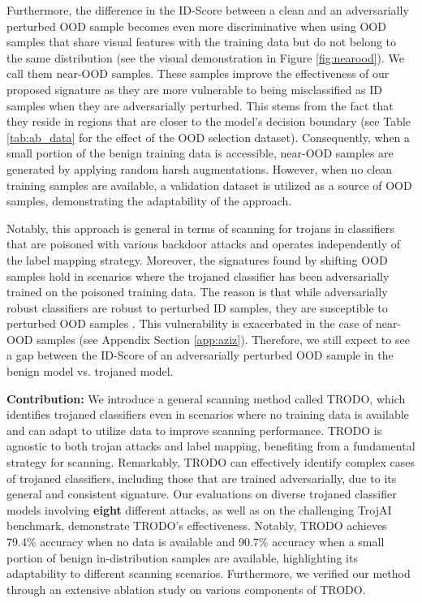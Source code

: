 Furthermore, the difference in the ID-Score between a clean and an adversarially perturbed OOD sample becomes even more discriminative when using OOD samples that share visual features with the training data but do not belong to the same distribution (see the visual demonstration in Figure \ref{fig:nearood}). We call them near-OOD samples. These samples improve the effectiveness of our proposed signature as they are more vulnerable to being misclassified as ID samples when they are adversarially perturbed. This stems from the fact that they reside in regions that are closer to the model's decision boundary (see Table \ref{tab:ab_data} for the effect of the OOD selection dataset). Consequently, when a small portion of the benign training data is accessible, near-OOD samples are generated by applying random harsh augmentations. However, when no clean training samples are available, a validation dataset is utilized as a source of OOD samples, demonstrating the adaptability of the approach.

Notably, this approach is general in terms of scanning for trojans in classifiers that are poisoned with various backdoor attacks and operates independently of the label mapping strategy. Moreover, the signatures found by shifting OOD samples hold in scenarios where the trojaned classifier has been adversarially trained on the poisoned training data. The reason is that while adversarially robust classifiers are robust to perturbed ID samples, they are susceptible to perturbed OOD samples \cite{azizmalayeri2022your,lo2022adversarially,chen2020robust,shao2020open,shao2022open, bethune2023robust, goodge2021robustness, chen2021atom}. This vulnerability is exacerbated in the case of near-OOD samples (see Appendix Section  \ref{app:aziz}). Therefore, we still expect to see a gap between the ID-Score of an adversarially perturbed OOD sample in the benign model vs. trojaned model.

\textbf{Contribution:} We introduce a general scanning method called TRODO, which identifies trojaned classifiers even in scenarios where no training data is available and can adapt to utilize data to improve scanning performance. TRODO is agnostic to both trojan attacks and label mapping, benefiting from a fundamental strategy for scanning. Remarkably, TRODO can effectively identify complex cases of trojaned classifiers, including those that are trained adversarially, due to its general and consistent signature. Our evaluations on diverse trojaned classifier models involving \textbf{eight} different attacks, as well as on the challenging TrojAI \cite{trojai} benchmark, demonstrate TRODO’s effectiveness. Notably, TRODO achieves 79.4\% accuracy when no data is available and 90.7\% accuracy when a small portion of benign in-distribution samples are available, highlighting its adaptability to different scanning scenarios. Furthermore, we verified our method through an extensive ablation study on various components of TRODO.


